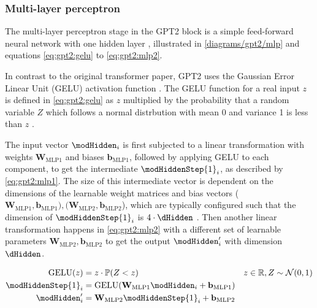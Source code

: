 \subsubsection{Multi-layer perceptron}
\label{gpt2:mlp}


The multi-layer perceptron stage in the GPT2 block is a simple feed-forward neural network with one hidden layer , illustrated in \cref{diagrams/gpt2/mlp} and equations \eqref{eq:gpt2:gelu} to \eqref{eq:gpt2:mlp2}.

In contrast to the original transformer paper, GPT2 uses the Gaussian Error Linear Unit (GELU) activation function .
The GELU function for a real input $z$ is defined in \cref{eq:gpt2:gelu} as $z$ multiplied by the probability that a random variable $Z$ which follows a normal distrbution with mean 0 and variance 1 is less than $z$ \cite{gelu}.

The input vector $\modHidden_i$ is first subjected to a linear transformation with weights $\mathbf{W}_\textrm{MLP1}$ and biases $\mathbf{b}_\textrm{MLP1}$, followed by applying GELU to each component, to get the intermediate $\modHiddenStep{1}_i$, as described by \cref{eq:gpt2:mlp1}. The size of this intermediate vector is dependent on the dimensions of the learnable weight matrices and bias vectors ($\mathbf{W}_\textrm{MLP1}, \mathbf{b}_\textrm{MLP1}), (\mathbf{W}_\textrm{MLP2}, \mathbf{b}_\textrm{MLP2}$), which are typically configured such that the dimension of $\modHiddenStep{1}_i$ is $4 \cdot \dHidden$  \cite[source code]{HuggingFaceGPT2}.
Then another linear transformation happens in \cref{eq:gpt2:mlp2} with a different set of learnable parameters $\mathbf{W}_\textrm{MLP2}, \mathbf{b}_\textrm{MLP2}$ to get the output $\modHidden'_i$ with dimension $\dHidden$.

\begin{align}
	\mathrm{GELU}(z) &= z \cdot \mathbb{P}(Z<z) & z \in \mathbb{R}, Z \sim \mathcal{N}(0, 1)
	\label{eq:gpt2:gelu}
	\\
	\modHiddenStep{1}_i &= \mathrm{GELU}(\mathbf{W}_\textrm{MLP1} \modHidden_i + \mathbf{b}_\textrm{MLP1})
	\label{eq:gpt2:mlp1}
	\\
	\modHidden'_i &= \mathbf{W}_\textrm{MLP2} \modHiddenStep{1}_i + \mathbf{b}_\textrm{MLP2}
	\label{eq:gpt2:mlp2}
\end{align}

